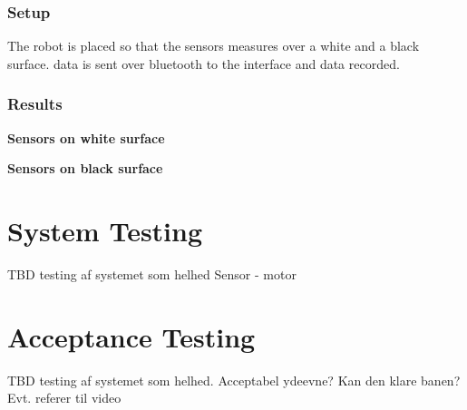 \subsubsection{Setup}
The robot is placed so that the sensors measures over a white and a black surface.
data is sent over bluetooth to the interface and data recorded.

\subsubsection{Results}
\textbf{Sensors on white surface}

\textbf{Sensors on black surface}

\section{System Testing}
TBD testing af systemet som helhed
Sensor - motor

\section{Acceptance Testing}
TBD testing af systemet som helhed. Acceptabel ydeevne?
Kan den klare banen? 
Evt. referer til video





